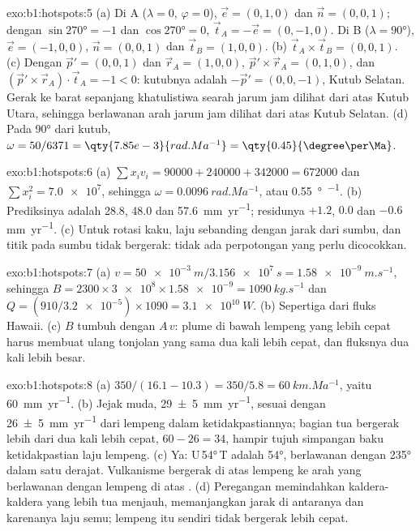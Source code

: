 \begin{solution}{exo:b1:hotspots:5}
(a) Di A ($\lambda = 0$, $\varphi = 0$), $\vec e = (0, 1, 0)$ dan
$\vec n = (0, 0, 1)$; dengan $\sin\ang{270} = -1$ dan $\cos\ang{270} = 0$,
$\vec t_A = -\vec e = (0, -1, 0)$. Di B ($\lambda = \ang{90}$),
$\vec e = (-1, 0, 0)$, $\vec n = (0, 0, 1)$ dan $\vec t_B = (1, 0, 0)$.
(b) $\vec t_A\times\vec t_B = (0, 0, 1)$. (c) Dengan $\vec p' = (0, 0, 1)$ dan
$\vec r_A = (1, 0, 0)$, $\vec p'\times\vec r_A = (0, 1, 0)$, dan
$(\vec p'\times\vec r_A)\cdot\vec t_A = -1 < 0$: kutubnya adalah
$-\vec p' = (0, 0, -1)$, Kutub Selatan. Gerak ke barat sepanjang khatulistiwa
searah jarum jam dilihat dari atas Kutub Utara, sehingga berlawanan arah jarum jam dilihat dari atas
Kutub Selatan. (d) Pada \ang{90} dari kutub, $\omega = 50/6371 =
\qty{7.85e-3}{rad.Ma^{-1}} = \qty{0.45}{\degree\per\Ma}$.
\end{solution}

\begin{solution}{exo:b1:hotspots:6}
(a) $\sum x_i v_i = 90000 + 240000 + 342000 = \num{672000}$ dan
$\sum x_i^2 = \num{7.0e7}$, sehingga $\omega = \qty{0.0096}{rad.Ma^{-1}}$, atau
\qty{0.55}{\degree\per\Ma}. (b) Prediksinya adalah 28.8, 48.0 dan
\qty{57.6}{mm.yr^{-1}}; residunya $+1.2$, $0.0$ dan $-0.6$
\unit{mm.yr^{-1}}. (c) Untuk rotasi kaku, laju sebanding dengan
jarak dari sumbu, dan titik pada sumbu tidak bergerak: tidak ada
perpotongan yang perlu dicocokkan.
\end{solution}

\begin{solution}{exo:b1:hotspots:7}
(a) $v = \qty{50e-3}{m}/\qty{3.156e7}{s} = \qty{1.58e-9}{m.s^{-1}}$, sehingga
$B = 2300\times\num{3e8}\times\num{1.58e-9} = \qty{1090}{kg.s^{-1}}$ dan
$Q = (910/\num{3.2e-5})\times1090 = \qty{3.1e10}{W}$. (b) Sepertiga dari
fluks Hawaii. (c) $B$ tumbuh dengan $A\,v$: plume di bawah lempeng yang lebih cepat
harus membuat ulang tonjolan yang sama dua kali lebih cepat, dan fluksnya dua kali lebih besar.
\end{solution}

\begin{solution}{exo:b1:hotspots:8}
(a) $350/(16.1 - 10.3) = 350/5.8 = \qty{60}{km.Ma^{-1}}$, yaitu
\qty{60}{mm.yr^{-1}}. (b) Jejak muda, \qty{29 \pm 5}{mm.yr^{-1}}, sesuai
dengan \qty{26 \pm 5}{mm.yr^{-1}} dari lempeng dalam ketidakpastiannya; bagian
tua bergerak lebih dari dua kali lebih cepat, $60 - 26 = 34$, hampir tujuh simpangan baku
ketidakpastian laju lempeng. (c) Ya: U\,\ang{54}\,T adalah 
\ang{54}, berlawanan dengan \ang{235} dalam satu derajat. Vulkanisme bergerak di atas
lempeng ke arah yang berlawanan dengan lempeng di atas . (d) Peregangan memindahkan
kaldera-kaldera yang lebih tua menjauh, memanjangkan jarak di antaranya dan karenanya
laju semu; lempeng itu sendiri tidak bergerak lebih cepat.
\end{solution}

